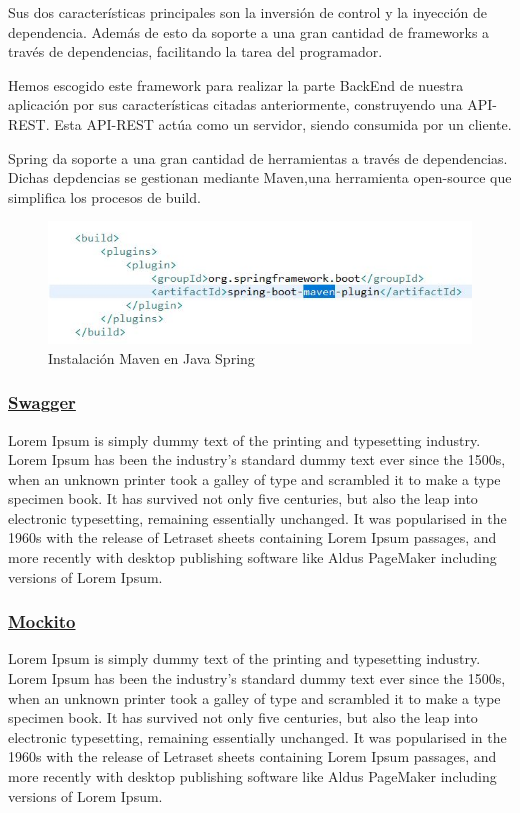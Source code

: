     Sus dos características principales son la inversión de control y la inyección de dependencia. Además de esto da soporte a una gran cantidad de frameworks a través de dependencias, facilitando la tarea del programador.
     \newline
     
     Hemos escogido este framework para realizar la parte BackEnd de nuestra aplicación por sus características citadas anteriormente, construyendo una API-REST. Esta API-REST actúa como un servidor, siendo consumida por un cliente.
     \newline
    
    Spring da soporte a una gran cantidad de herramientas a través de dependencias. Dichas depdencias se gestionan mediante Maven,una herramienta open-source que simplifica los procesos de build.
    
    \begin{figure}[h]
    \centering
    \includegraphics[width=1\textwidth]{images/maven}
    \caption{Instalación Maven en Java Spring}
    \end{figure}
    
    

        \subsubsection{\underline{Swagger}}
        Lorem Ipsum is simply dummy text of the printing and typesetting industry. Lorem Ipsum has been the industry's standard dummy text ever since the 1500s, when an unknown printer took a galley of type and scrambled it to make a type specimen book. It has survived not only five centuries, but also the leap into electronic typesetting, remaining essentially unchanged. It was popularised in the 1960s with the release of Letraset sheets containing Lorem Ipsum passages, and more recently with desktop publishing software like Aldus PageMaker including versions of Lorem Ipsum.
        
        \subsubsection{\underline{Mockito}}
        Lorem Ipsum is simply dummy text of the printing and typesetting industry. Lorem Ipsum has been the industry's standard dummy text ever since the 1500s, when an unknown printer took a galley of type and scrambled it to make a type specimen book. It has survived not only five centuries, but also the leap into electronic typesetting, remaining essentially unchanged. It was popularised in the 1960s with the release of Letraset sheets containing Lorem Ipsum passages, and more recently with desktop publishing software like Aldus PageMaker including versions of Lorem Ipsum.

